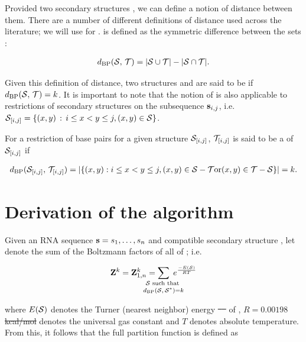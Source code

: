 \documentclass[11pt, oneside]{Thesis} %
\providecommand{\DIFadd}[1]{{\protect\color{blue}\uwave{#1}}} %
\providecommand{\DIFdel}[1]{{\protect\color{red}\sout{#1}}}                      %
\providecommand{\DIFaddbegin}{} %
\providecommand{\DIFaddend}{} %
\providecommand{\DIFdelbegin}{} %
\providecommand{\DIFdelend}{} %
\begin{document}
Provided two secondary structures \strST, we can define a notion of
distance between them. There are a number of different definitions of distance
used across the literature; we will use {\em \bpd} for \fftbor.
\Bpd is defined as the symmetric difference between the sets
\strST:

\begin{align}
\label{eq:fftbor:dBP}
\dBP{\str}{\strT} = |\str \cup \strT| - |\str \cap \strT|.
\end{align}

Given this definition of distance, two structures \str and \strT are said to
be \kNbrs if $d_{\text{BP}}(\mathcal S,\,\mathcal T) = k$. It is important to note that
the notion of \bpd is also applicable to restrictions of secondary structures
on the subsequence ${\bf s}_{i,j}$,
i.e. $\mathcal S_{[i,j]} = \{ (x,y) \,:\, i \leq  x < y \leq j,  (x,y) \in \mathcal S \}$.

For a restriction of base pairs for a given structure $\mathcal S_{[i,j]}$,
$\mathcal T_{[i,j]}$ is said to be a \kNbr of $\mathcal S_{[i,j]}$ if

\begin{align}
\label{eq:fftbor:dBPonRestriction}
\dBP{\str_{[i,j]}}{\strT_{[i,j]}} =
|\{ (x,y): i \leq x<y\leq j,
(x,y) \in \str - \strT \text{or} (x,y) \in \strT - \str \}| = k.
\end{align}

\section{Derivation of the \fftbor algorithm}
\label{sec:fftbor:math}

Given an RNA sequence ${\bf s}=s_1,\dots,s_n$ and compatible secondary structure
\strSt, let  denote the sum of the Boltzmann factors
\boltzf{\str} of all \kNbrs \str of \strSt; i.e.

\begin{align}
\bfZ{k}{} = \bfZ{k}{1,n} =
\sum_{\mathclap{\substack{\str \text{ such that } \rule[-.5ex]{0pt}{0pt} \\
 \dBP{\str}{\strSt}=k}}}\;
\boltzF{\str}
\end{align}

where $E(\mathcal S)$ denotes the Turner (nearest neighbor)
energy \DIFdelbegin \DIFdel{\mbox{%
\citep{}
}%
}\DIFdelend \DIFaddbegin \DIFadd{\mbox{%
\citep{xia:RNA}
}%
}\DIFaddend of \str, \DIFdelbegin \DIFdel{$R = 0.00198$ kcal/mol }\DIFdelend \DIFaddbegin \DIFadd{$R = \kmolk{0.00198}$ }\DIFaddend denotes the universal
gas constant and $T$ denotes absolute temperature. From this, it follows that
the full partition function is defined as
\end{document}
